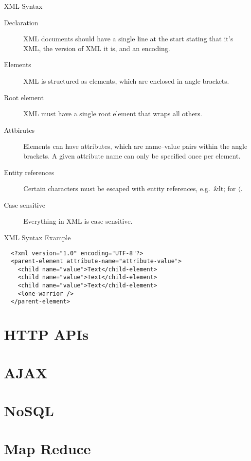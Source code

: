\begin{frame}{XML Syntax}
  \begin{description}
    \item[Declaration] XML documents should have a single line at the start stating that it's XML, the version of XML it is, and an encoding.
    \item[Elements] XML is structured as elements, which are enclosed in angle brackets.
    \item[Root element] XML must have a single root element that wraps all others.
    \item[Attbirutes] Elements can have attributes, which are name--value pairs within the angle brackets. A given attribute name can only be specified once per element.
    \item[Entity references] Certain characters must be escaped with entity references, e.g.\ \&lt; for $\langle$.
    \item[Case sensitive] Everything in XML is case sensitive.
  \end{description}
\end{frame}

\begin{frame}[fragile]{XML Syntax Example}
  \begin{verbatim}
  <?xml version="1.0" encoding="UTF-8"?>
  <parent-element attribute-name="attribute-value">
    <child name="value">Text</child-element>
    <child name="value">Text</child-element>
    <child name="value">Text</child-element>
    <lone-warrior />
  </parent-element>
  \end{verbatim}
\end{frame}

\section{HTTP APIs}

\section{AJAX}

\section{NoSQL}

\section{Map Reduce}